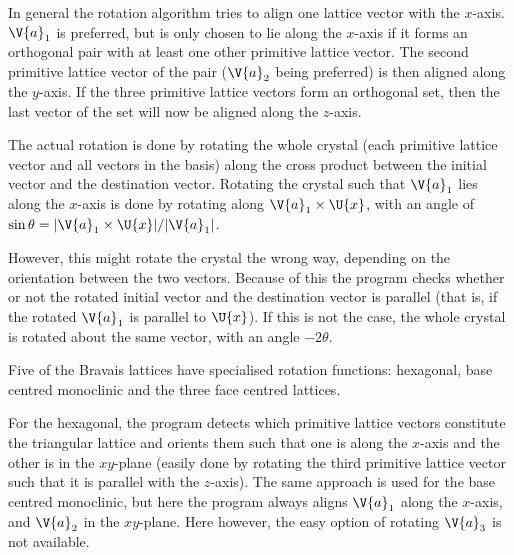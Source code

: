 \documentclass[a4paper,10pt]{article}
\numberwithin{equation}{section}
\begin{document}
	In general the rotation algorithm tries to align one lattice vector with the $ x $-axis. $ \V{a}_1 $ is preferred, but is only chosen to lie along the $ x $-axis if it forms an orthogonal pair with at least one other primitive lattice vector. The second primitive lattice vector of the pair ($\V{a}_2$ being preferred) is then aligned along the $ y $-axis. If the three primitive lattice vectors form an orthogonal set, then the last vector of the set will now be aligned along the $ z $-axis.
	
	The actual rotation is done by rotating the whole crystal (each primitive lattice vector and all vectors in the basis) along the cross product between the initial vector and the destination vector. Rotating the crystal such that $ \V{a}_1 $ lies along the $ x $-axis is done by rotating along $ \V{a}_1 \times \U{x} $, with an angle of $ \sin \theta = |\V{a}_1 \times \U{x}| / |\V{a}_1| $.
	
	However, this might rotate the crystal the wrong way, depending on the orientation between the two vectors. Because of this the program checks whether or not the rotated initial vector and the destination vector is parallel (that is, if the rotated $ \V{a}_1 $ is parallel to $ \U{x} $). If this is not the case, the whole crystal is rotated about the same vector, with an angle $ -2\theta $.
	
	Five of the Bravais lattices have specialised rotation functions: hexagonal, base centred monoclinic and the three face centred lattices.
	
	For the hexagonal, the program detects which primitive lattice vectors constitute the triangular lattice and orients them such that one is along the $ x $-axis and the other is in the $ xy $-plane (easily done by rotating the third primitive lattice vector such that it is parallel with the $ z $-axis). The same approach is used for the base centred monoclinic, but here the program always aligns $ \V{a}_1 $ along the $ x $-axis, and $ \V{a}_2 $ in the $ xy $-plane. Here however, the easy option of rotating $ \V{a}_3 $ is not available. 
	
\end{document}
